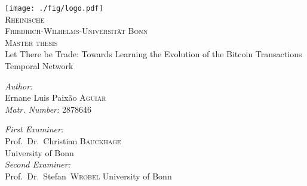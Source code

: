 \documentclass[12pt, %
abstract=on %
]{scrreprt} %
\theoremstyle{definition}
\theoremstyle{remark}
\begin{document}
%
\begin{titlepage}
        \begin{center}

            \texttt{[image: ./fig/logo.pdf]}\\

            \textsc{\LARGE Rheinische\\[5mm] Friedrich-Wilhelms-Universität Bonn}\\[1.5cm]

            \textsc{\Large Master thesis}\\[1.5cm]

            { \Large Let There be Trade: Towards Learning the Evolution of the Bitcoin Transactions Temporal Network}\\[3.4cm]

            \begin{minipage}[t]{0.4\textwidth}
                \begin{flushleft} \large
                    \emph{Author:} \\
                    Ernane Luis Paixão \textsc{Aguiar} \\
                    \emph{Matr. Number:}                 
                    2878646
                \end{flushleft}
            \end{minipage}
            \begin{minipage}[t]{0.5\textwidth}
                \begin{flushright} \large
                    \emph{First Examiner:} \\
                    Prof.~Dr.~Christian \textsc{Bauckhage} \\
                    University of Bonn \\ [0.5cm]
                    \emph{Second Examiner:} \\ 
                    Prof.~Dr.~Stefan~\textsc{Wrobel}
                    University of Bonn \\[0.5cm]
                    

                \end{flushright}
            \end{minipage}

            \vfill


        \end{center}
    \end{titlepage}
    
\end{document}
